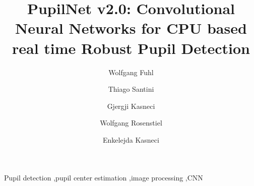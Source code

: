 \documentclass[preprint,review,12pt]{elsarticle}
\begin{document}
	\begin{frontmatter}



		\title{PupilNet v2.0: Convolutional Neural Networks for CPU based real time Robust Pupil Detection}

		


		\author[adrtue]{Wolfgang Fuhl}
		\author[adrtue]{Thiago Santini}
		\author[adrwien]{Gjergji Kasneci}
		\author[adrtue2]{Wolfgang Rosenstiel}
		\author[adrtue]{Enkelejda Kasneci}

		\address[adrtue]{Eberhard Karls University T\"ubingen, Perception Engineering, Germany,72076 T\"ubingen,Sand 14, Tel.: +49 70712970492, wolfgang.fuhl@uni-tuebingen.de, thiago.santini@uni-tuebingen.de, Enkelejda.Kasneci@uni-tuebingen.de}
		\address[adrtue2]{Eberhard Karls University T\"ubingen, Technical Computer Science, Germany,72076 T\"ubingen,Sand 14, Tel.: +49 70712970492, Wolfgang.Rosenstiel@uni-tuebingen.de}
		\address[adrwien]{SCHUFA InnovationLab, SCHUFA Holding AG, Germany, 65201 Wiesbaden, Kormoranweg 5, Tel.: +49 611 92780, gkasneci@googlemail.com}

		

		\begin{keyword}

			Pupil detection \sep pupil center estimation \sep image processing \sep CNN


		\end{keyword}

	\end{frontmatter}
\end{document}
